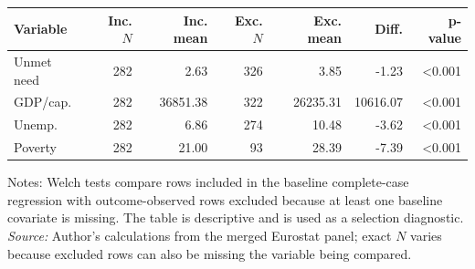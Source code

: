 \begingroup
\small
\begin{tabular}{@{}lrrrrrr@{}}
\toprule
Variable & Inc. \(N\) & Inc. mean & Exc. \(N\) & Exc. mean & Diff. & p-value \\
\midrule
Unmet need & 282 & 2.63 & 326 & 3.85 & -1.23 & <0.001 \\
GDP/cap. & 282 & 36851.38 & 322 & 26235.31 & 10616.07 & <0.001 \\
Unemp. & 282 & 6.86 & 274 & 10.48 & -3.62 & <0.001 \\
Poverty & 282 & 21.00 & 93 & 28.39 & -7.39 & <0.001 \\
\bottomrule
\end{tabular}

\vspace{0.2em}
\begin{minipage}{0.92\textwidth}\scriptsize Notes: Welch tests compare rows included in the baseline complete-case regression with outcome-observed rows excluded because at least one baseline covariate is missing. The table is descriptive and is used as a selection diagnostic. \textit{Source:} Author's calculations from the merged Eurostat panel; exact \(N\) varies because excluded rows can also be missing the variable being compared.\end{minipage}
\endgroup
